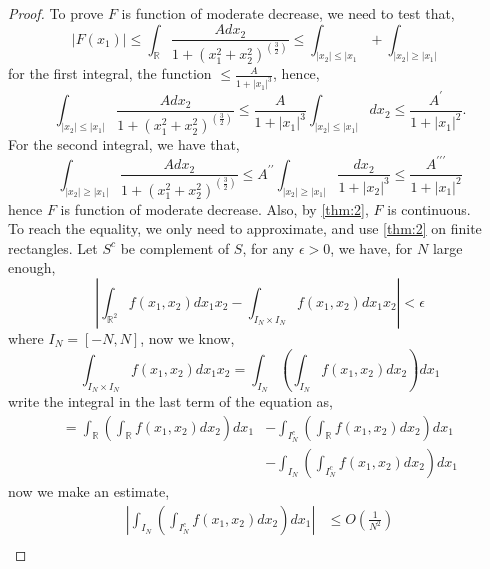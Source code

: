 \documentclass[a4paper]{article}
\numberwithin{equation}{subsection}
\begin{document}
\begin{proof}
    To prove $F$ is function of moderate decrease, we need to test that,
    \begin{equation}
        |F(x_1)| \leq \int_{\mathbb{R}} \frac{Adx_2}{1+(x_1^2 + x_2^2)^(\frac{3}{2})} \leq \int_{|x_2| \leq |x_1} + \int_{|x_2| \geq |x_1|}
    \end{equation}
    for the first integral, the function $\leq \frac{A}{1+|x_1|^3}$, hence,
    \begin{equation}
        \int_{|x_2| \leq |x_1|} \frac{Adx_2}{1+(x_1^2 + x_2^2)^(\frac{3}{2})} \leq \frac{A}{1+|x_1|^3} \int_{|x_2| \leq |x_1|} dx_2 \leq \frac{A^\prime}{1+|x_1|^2}.
    \end{equation}
    For the second integral, we have that,
    \begin{equation}
        \int_{|x_2| \geq |x_1|} \frac{Adx_2}{1+(x_1^2 + x_2^2)^(\frac{3}{2})} \leq A^{\prime\prime} \int_{|x_2| \geq |x_1|} \frac{dx_2}{1 + |x_2|^3} \leq \frac{A^{\prime\prime\prime}}{1+|x_1|^2}
    \end{equation}
    hence $F$ is function of moderate decrease. Also, by \cref{thm:2}, $F$ is continuous. \\
    To reach the equality, we only need to approximate, and use \cref{thm:2} on finite rectangles. Let $S^c$ be complement of $S$, for any $\epsilon>0$, we have, for $N$ large enough,
    \begin{equation}
        |\int_{\mathbb{R}^2} f(x_1, x_2) dx_1 x_2 - \int_{I_N\times I_N} f(x_1, x_2) dx_1 x_2| < \epsilon
    \end{equation}
    where $I_N = [-N, N]$, now we know,
    \begin{equation}
        \int_{I_N\times I_N} f(x_1, x_2) dx_1 x_2 = \int_{I_N} (\int_{I_N} f(x_1, x_2) dx_2) dx_1
    \end{equation}
    write the integral in the last term of the equation as,
    \begin{equation}
        \begin{split}
            = \int_{\mathbb{R}} (\int_{\mathbb{R}} f(x_1, x_2) dx_2) dx_1 &- \int_{I_N^c} (\int_{\mathbb{R}} f(x_1, x_2) dx_2) dx_1 \\
            &- \int_{I_N} (\int_{I_N^c} f(x_1, x_2) dx_2) dx_1
        \end{split}
    \end{equation}
    now we make an estimate,
    \begin{equation}
        \begin{split}
            |\int_{I_N} (\int_{I_N^c} f(x_1, x_2) dx_2) dx_1| &\leq O(\frac{1}{N^2}) \\

\end{split}
\end{equation}
\end{proof}
\end{document}
